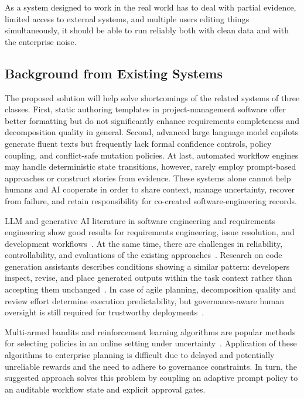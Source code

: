 \documentclass[manuscript,review]{acmart}
\begin{document}
As a system designed to work in the real world has to deal with partial evidence, limited access to external systems, and multiple users editing things simultaneously, it should be able to run reliably both with clean data and with the enterprise noise.

\subsection{Background from Existing Systems}
The proposed solution will help solve shortcomings of the related systems of three classes. First, static authoring templates in project-management software offer better formatting but do not significantly enhance requirements completeness and decomposition quality in general. Second, advanced large language model copilots generate fluent texts but frequently lack formal confidence controls, policy coupling, and conflict-safe mutation policies. At last, automated workflow engines may handle deterministic state transitions, however, rarely employ prompt-based approaches or construct stories from evidence. These systems alone cannot help humans and AI cooperate in order to share context, manage uncertainty, recover from failure, and retain responsibility for co-created software-engineering records.

LLM and generative AI literature in software engineering and requirements engineering show good results for requirements engineering, issue resolution, and development workflows~\cite{R60,R59}. At the same time, there are challenges in reliability, controllability, and evaluations of the existing approaches~\cite{R60,R59}. Research on code generation assistants describes conditions showing a similar pattern: developers inspect, revise, and place generated outputs within the task context rather than accepting them unchanged~\cite{R77,R78}. In case of agile planning, decomposition quality and review effort determine execution predictability, but governance-aware human oversight is still required for trustworthy deployments~\cite{R56,R52,R58}.

Multi-armed bandits and reinforcement learning algorithms are popular methods for selecting policies in an online setting under uncertainty~\cite{R84,R86,R100}. Application of these algorithms to enterprise planning is difficult due to delayed and potentially unreliable rewards and the need to adhere to governance constraints. In turn, the suggested approach solves this problem by coupling an adaptive prompt policy to an auditable workflow state and explicit approval gates.
\end{document}
